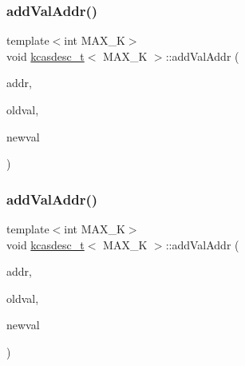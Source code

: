 \mbox{\label{classkcasdesc__t_a26f19763934c3b335fcda46d1645095c}} 
\subsubsection{\texorpdfstring{add\+Val\+Addr()}{addValAddr()}\hspace{0.1cm}{\footnotesize\ttfamily [1/2]}}
{\footnotesize\ttfamily template$<$int M\+A\+X\+\_\+K$>$ \\
void \hyperlink{classkcasdesc__t}{kcasdesc\+\_\+t}$<$ M\+A\+X\+\_\+K $>$\+::add\+Val\+Addr (\begin{DoxyParamCaption}\item[{\hyperlink{rq__unsafe_8h_ad45142aaf2ff20a036dc6242b8483e9c}{casword\+\_\+t} volatile $\ast$}]{addr,  }\item[{\hyperlink{rq__unsafe_8h_ad45142aaf2ff20a036dc6242b8483e9c}{casword\+\_\+t}}]{oldval,  }\item[{\hyperlink{rq__unsafe_8h_ad45142aaf2ff20a036dc6242b8483e9c}{casword\+\_\+t}}]{newval }\end{DoxyParamCaption})\hspace{0.3cm}{\ttfamily [inline]}}

\mbox{\label{classkcasdesc__t_a26f19763934c3b335fcda46d1645095c}} 
\subsubsection{\texorpdfstring{add\+Val\+Addr()}{addValAddr()}\hspace{0.1cm}{\footnotesize\ttfamily [2/2]}}
{\footnotesize\ttfamily template$<$int M\+A\+X\+\_\+K$>$ \\
void \hyperlink{classkcasdesc__t}{kcasdesc\+\_\+t}$<$ M\+A\+X\+\_\+K $>$\+::add\+Val\+Addr (\begin{DoxyParamCaption}\item[{\hyperlink{rq__unsafe_8h_ad45142aaf2ff20a036dc6242b8483e9c}{casword\+\_\+t} volatile $\ast$}]{addr,  }\item[{\hyperlink{rq__unsafe_8h_ad45142aaf2ff20a036dc6242b8483e9c}{casword\+\_\+t}}]{oldval,  }\item[{\hyperlink{rq__unsafe_8h_ad45142aaf2ff20a036dc6242b8483e9c}{casword\+\_\+t}}]{newval }\end{DoxyParamCaption})\hspace{0.3cm}{\ttfamily [inline]}}



